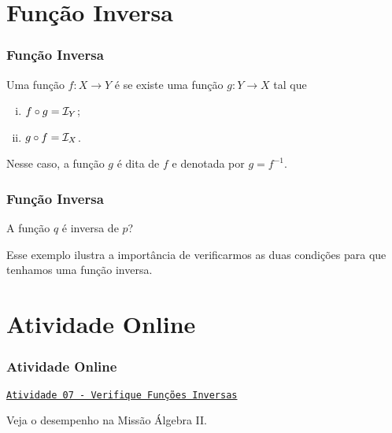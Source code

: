 \documentclass[brazil, notheorems, 10pt]{beamer}
\begin{document}


\section{Função Inversa}
\begin{frame}
\frametitle{Função Inversa} %

\begin{Def}\label{funinv}
Uma função $f: X \to Y$ é  se existe uma função $g:
Y \to X$ tal que
\begin{enumerate}[(i)]
	\item $f \circ g = \mathcal I_Y$;
	\item $g \circ f = \mathcal I_X$.
\end{enumerate}
Nesse caso, a função $g$ é dita  de $f$ e
denotada por $g = f^{-1}$.
\end{Def}

\end{frame}





\begin{frame}
\frametitle{Função Inversa} %

\begin{Exem}
A função $q$ é inversa de $p$?
\end{Exem}\pause
 Esse exemplo ilustra a importância de verificarmos as duas
 condições para que tenhamos uma função inversa.

\end{frame}

\section{Atividade Online}
\begin{frame}
\frametitle{Atividade Online} %

\href{https://pt.khanacademy.org/math/algebra2/manipulating-functions/verifying-that-functions-are-inverses/e/inverses_of_functions}
{{\tt Atividade 07 - Verifique Funções Inversas}}


Veja o desempenho na Missão Álgebra II.


\end{frame}
\end{document}

